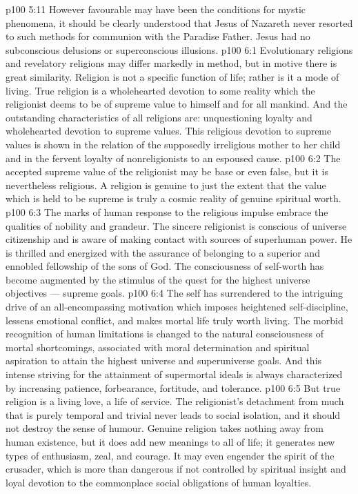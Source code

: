 \vs p100 5:11 However favourable may have been the conditions for mystic phenomena, it should be clearly understood that Jesus of Nazareth never resorted to such methods for communion with the Paradise Father. Jesus had no subconscious delusions or superconscious illusions.
\vs p100 6:1 Evolutionary religions and revelatory religions may differ markedly in method, but in motive there is great similarity. Religion is not a specific function of life; rather is it a mode of living. True religion is a wholehearted devotion to some reality which the religionist deems to be of supreme value to himself and for all mankind. And the outstanding characteristics of all religions are: unquestioning loyalty and wholehearted devotion to supreme values. This religious devotion to supreme values is shown in the relation of the supposedly irreligious mother to her child and in the fervent loyalty of nonreligionists to an espoused cause.
\vs p100 6:2 The accepted supreme value of the religionist may be base or even false, but it is nevertheless religious. A religion is genuine to just the extent that the value which is held to be supreme is truly a cosmic reality of genuine spiritual worth.
\vs p100 6:3 The marks of human response to the religious impulse embrace the qualities of nobility and grandeur. The sincere religionist is conscious of universe citizenship and is aware of making contact with sources of superhuman power. He is thrilled and energized with the assurance of belonging to a superior and ennobled fellowship of the sons of God. The consciousness of self\hyp{}worth has become augmented by the stimulus of the quest for the highest universe objectives --- supreme goals.
\vs p100 6:4 The self has surrendered to the intriguing drive of an all\hyp{}encompassing motivation which imposes heightened self\hyp{}discipline, lessens emotional conflict, and makes mortal life truly worth living. The morbid recognition of human limitations is changed to the natural consciousness of mortal shortcomings, associated with moral determination and spiritual aspiration to attain the highest universe and superuniverse goals. And this intense striving for the attainment of supermortal ideals is always characterized by increasing patience, forbearance, fortitude, and tolerance.
\vs p100 6:5 But true religion is a living love, a life of service. The religionist’s detachment from much that is purely temporal and trivial never leads to social isolation, and it should not destroy the sense of humour. Genuine religion takes nothing away from human existence, but it does add new meanings to all of life; it generates new types of enthusiasm, zeal, and courage. It may even engender the spirit of the crusader, which is more than dangerous if not controlled by spiritual insight and loyal devotion to the commonplace social obligations of human loyalties.
